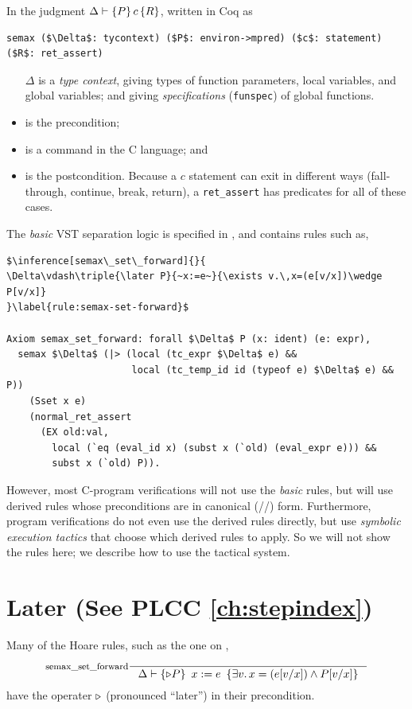 \documentclass[12pt,fleqn,openany,oneside,showtrims]{memoir}
\newcommand{\ychapter}[2]{\chapter[#1]{#1 \hfill \normalsize #2}}
\begin{document}
In the judgment $\Delta\vdash\{P\}\,c\,\{R\}$, written in Coq as
\begin{lstlisting}
semax ($\Delta$: tycontext) ($P$: environ->mpred) ($c$: statement) ($R$: ret_assert)
\end{lstlisting}
\vspace*{-\baselineskip}
\begin{itemize}
\item[$\Delta$] is a \emph{type context}, giving types of function parameters, local variables, and global variables; and giving \emph{specifications} (\lstinline{funspec}) of global functions.
\item[$P$] is the precondition;
\item[$c$] is a command in the C language; and
\item[$R$] is the postcondition.  Because a $c$ statement can exit in different ways (fall-through, continue, break, return), a \lstinline{ret_assert} 
has predicates for all of these cases.
\end{itemize}

The \emph{basic} VST separation logic is specified in , and contains rules such as,\label{refcard:later1}
\begin{lstlisting}
$\inference[semax\_set\_forward]{}{
\Delta\vdash\triple{\later P}{~x:=e~}{\exists v.\,x=(e[v/x])\wedge P[v/x]}
}\label{rule:semax-set-forward}$

Axiom semax_set_forward: forall $\Delta$ P (x: ident) (e: expr),
  semax $\Delta$ (|> (local (tc_expr $\Delta$ e) && 
                      local (tc_temp_id id (typeof e) $\Delta$ e) && P))
    (Sset x e) 
    (normal_ret_assert 
      (EX old:val, 
        local (`eq (eval_id x) (subst x (`old) (eval_expr e))) &&
        subst x (`old) P)).
\end{lstlisting}

However, most C-program verifications will not use the \emph{basic} rules, but will use derived rules whose preconditions are in canonical
(\PROP/\LOCAL/\SEP) form.  Furthermore, program verifications
do not even use the derived rules directly, but use 
\emph{symbolic execution tactics} that choose which derived rules to apply.
So we will not show the rules here; we describe how to use
the tactical system.

\ychapter{Later}{(See PLCC \autoref{ch:stepindex})}
Many of the Hoare rules, such as the one on ,
\[\inference[semax\_set\_forward]{}{
\Delta\vdash\triple{\later P}{~x:=e~}{\exists v.\,x=(e[v/x])\wedge P[v/x]}
}\label{rule:semax-set-forward}\]
have the operater $\triangleright$ (pronounced ``later'') in their precondition.
\end{document}
